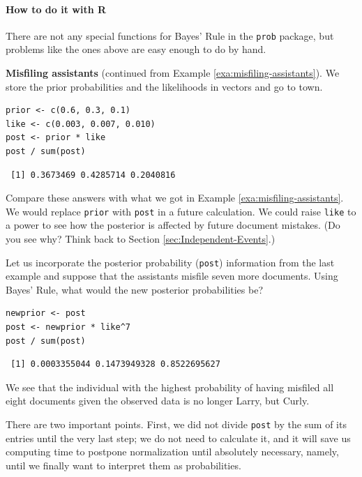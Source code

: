 \documentclass[captions=tableheading]{scrbook}
\begin{document}
\paragraph*{How to do it with \textsf{R}}

There are not any special functions for Bayes' Rule in the \texttt{prob} package, but problems like the ones above are easy enough to do by hand.

\begin{example}
\textbf{Misfiling assistants} (continued from Example \ref{exa:misfiling-assistants}). We store the prior probabilities and the likelihoods in vectors and go to town.


\begin{verbatim}
prior <- c(0.6, 0.3, 0.1)
like <- c(0.003, 0.007, 0.010)
post <- prior * like
post / sum(post)
\end{verbatim}

\begin{verbatim}
 [1] 0.3673469 0.4285714 0.2040816
\end{verbatim}

\end{example}


Compare these answers with what we got in Example \ref{exa:misfiling-assistants}. We would replace \texttt{prior} with \texttt{post} in a future calculation. We could raise \texttt{like} to a power to see how the posterior is affected by future document mistakes. (Do you see why? Think back to Section \ref{sec:Independent-Events}.)


\begin{example}
Let us incorporate the posterior probability (\texttt{post}) information from the last example and suppose that the assistants misfile seven more documents. Using Bayes' Rule, what would the new posterior probabilities be?


\begin{verbatim}
newprior <- post
post <- newprior * like^7
post / sum(post)
\end{verbatim}

\begin{verbatim}
 [1] 0.0003355044 0.1473949328 0.8522695627
\end{verbatim}

We see that the individual with the highest probability of having misfiled all eight documents given the observed data is no longer Larry, but Curly. 
\end{example}

There are two important points. First, we did not divide \texttt{post} by the sum of its entries until the very last step; we do not need to calculate it, and it will save us computing time to postpone normalization until absolutely necessary, namely, until we finally want to interpret them as probabilities.
\end{document}
